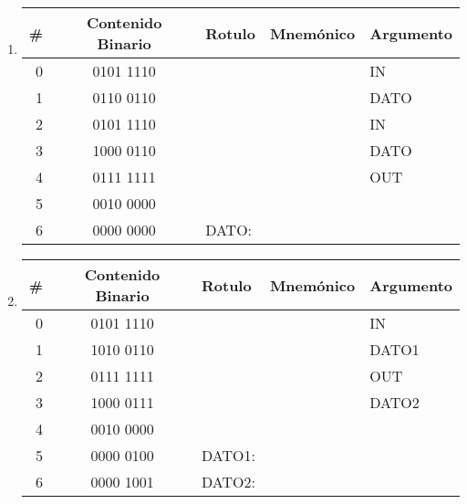 \documentclass[12pt]{article}
\begin{document}
\begin{enumerate}
\begin{enumerate}
            \begin{enumerate}
            \itemsep2em \parskip0pt 

                \item \begin{tabular}{|r||c||l|l|l|}

                    \hline

                    \textbf{\#} & \textbf{Contenido Binario} & \textbf{Rotulo}
                    & \textbf{Mnemónico} & \textbf{Argumento} \\
                    \hline
                    \hline

                    0 & 0101 1110 & & & IN\\ \hline
                    1 & 0110 0110 & & & DATO\\ \hline
                    2 & 0101 1110 & & & IN\\ \hline
                    3 & 1000 0110 & & & DATO\\ \hline
                    4 & 0111 1111 & & & OUT\\ \hline
                    5 & 0010 0000 & & & \\ \hline
                    6 & 0000 0000 & DATO: & & \\ \hline

                \end{tabular}

                \item \begin{tabular}{|r||c||l|l|l|}

                    \hline

                    \textbf{\#} & \textbf{Contenido Binario} & \textbf{Rotulo}
                    & \textbf{Mnemónico} & \textbf{Argumento} \\
                    \hline
                    \hline

                    0 & 0101 1110 & & & IN\\ \hline
                    1 & 1010 0110 & & & DATO1\\ \hline
                    2 & 0111 1111 & & & OUT\\ \hline
                    3 & 1000 0111 & & & DATO2\\ \hline
                    4 & 0010 0000 & & & \\ \hline
                    5 & 0000 0100 & DATO1: & & \\ \hline
                    6 & 0000 1001 & DATO2: & & \\ \hline


\end{tabular}
\end{enumerate}
\end{enumerate}
\end{enumerate}
\end{document}
